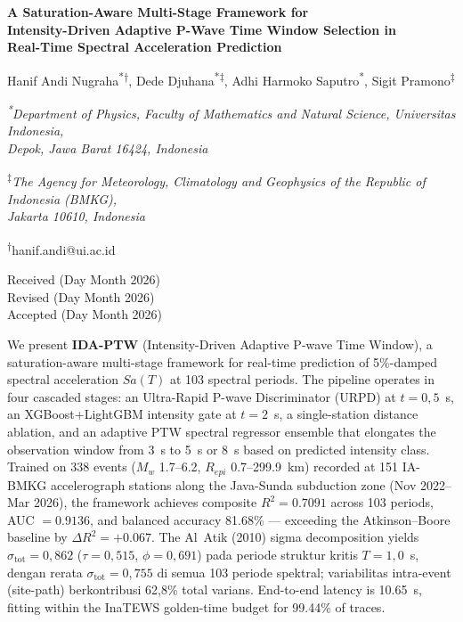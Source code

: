 \documentclass[10pt]{article}
\newcommand{\jetTitle}[1]{%
  \begin{center}\bfseries\fontsize{10}{12}\selectfont #1\end{center}\vspace{1em}}
\newcommand{\jetAuthors}[1]{%
  \begin{center}\fontsize{8}{10}\selectfont #1\end{center}}
\newcommand{\jetAffil}[1]{%
  \begin{center}\fontsize{8}{10}\selectfont\itshape #1\end{center}}
\newcommand{\jetEmail}[1]{%
  \begin{center}\fontsize{8}{10}\selectfont #1\end{center}}
\newcommand{\jetReceived}[3]{%
  \begin{center}\fontsize{9}{11}\selectfont
   Received #1\\Revised #2\\Accepted #3
  \end{center}\vspace{0.5em}}
\renewenvironment{abstract}{%
  \par\addvspace{0.5em}%
  \list{}{\leftmargin=0.25in \rightmargin=0.25in
          \topsep=0pt \parsep=0pt}\item[]%
  \fontsize{8}{10}\selectfont
}{%
  \endlist\par\addvspace{0.3em}%
}
\newcommand{\jetfnasterisk}{\textsuperscript{*}}
\newcommand{\jetfndagger}{\textsuperscript{$\dagger$}}
\newcommand{\jetfndaggerd}{\textsuperscript{$\ddagger$}}
\begin{document}
\thispagestyle{firstpage}

\jetTitle{A Saturation-Aware Multi-Stage Framework for\\
Intensity-Driven Adaptive P-Wave Time Window Selection in\\
Real-Time Spectral Acceleration Prediction}

\jetAuthors{Hanif Andi Nugraha\jetfnasterisk\jetfndagger,
Dede Djuhana\jetfnasterisk\jetfndaggerd,
Adhi Harmoko Saputro\jetfnasterisk,
Sigit Pramono\jetfndaggerd}

\jetAffil{\textsuperscript{*}Department of Physics, Faculty of Mathematics
and Natural Science, Universitas Indonesia,\\
Depok, Jawa Barat 16424, Indonesia}

\jetAffil{\textsuperscript{$\ddagger$}The Agency for Meteorology, Climatology
and Geophysics of the Republic of Indonesia (BMKG),\\
Jakarta 10610, Indonesia}

\jetEmail{\textsuperscript{$\dagger$}hanif.andi@ui.ac.id}

\jetReceived{(Day Month 2026)}{(Day Month 2026)}{(Day Month 2026)}

\begin{abstract}
We present \textbf{IDA-PTW} (Intensity-Driven Adaptive P-wave Time Window),
a saturation-aware multi-stage framework for real-time prediction of 5\%-damped
spectral acceleration $Sa(T)$ at 103 spectral periods. The pipeline operates
in four cascaded stages: an Ultra-Rapid P-wave Discriminator (URPD) at
$t = 0{,}5$~s, an XGBoost+LightGBM intensity gate at $t = 2$~s, a single-station
distance ablation, and an adaptive PTW spectral regressor ensemble that
elongates the observation window from 3~s to 5~s or 8~s based on predicted
intensity class. Trained on 338 events ($M_w$ 1.7--6.2, $R_{epi}$ 0.7--299.9~km)
recorded at 151 IA-BMKG accelerograph stations along the Java-Sunda subduction
zone (Nov 2022--Mar 2026), the framework achieves composite $R^2 = 0.7091$ across 103
periods, AUC $= 0.9136$, and balanced accuracy 81.68\% --- exceeding the
Atkinson--Boore baseline by $\Delta R^2 = +0.067$. The Al~Atik (2010) sigma
decomposition yields $\sigma_{\mathrm{tot}} = 0{,}862$ ($\tau = 0{,}515$, $\phi = 0{,}691$) pada periode
struktur kritis $T = 1{,}0$~s, dengan rerata $\sigma_{\mathrm{tot}} = 0{,}755$ di semua 103 periode spektral;
variabilitas intra-event (site-path) berkontribusi 62{,}8\% total varians. End-to-end latency is 10.65~s, fitting within the InaTEWS
golden-time budget for 99.44\% of traces.
\end{abstract}
\end{document}
